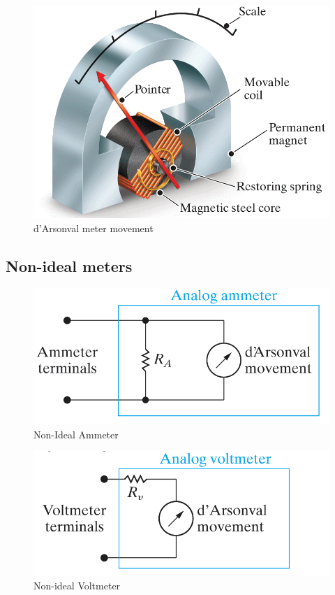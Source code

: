 \documentclass[14pt]{memoir}
\begin{document}
\begin{figure}[H]
\begin{center}
\includegraphics[scale=0.50]{fig/fig03_25.png}
\caption{d'Arsonval meter movement}
\label{fig:fig03_25}
\end{center}
\end{figure}

\subsection{Non-ideal meters}

\begin{figure}[H]
\begin{center}
\includegraphics[scale=0.60]{fig/fig03_26.png}
\caption{Non-Ideal Ammeter}
\label{fig:fig03_26}
\end{center}
\end{figure}

\begin{figure}[H]
\begin{center}
\includegraphics[scale=0.60]{fig/fig03_27.png}
\caption{Non-ideal Voltmeter}
\label{fig:fig03_27}
\end{center}
\end{figure}
\end{document}
